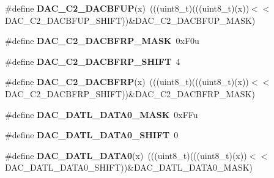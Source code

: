 \begin{DoxyCompactItemize}
\item 
\#define {\bfseries D\+A\+C\+\_\+\+C2\+\_\+\+D\+A\+C\+B\+F\+UP}(x)~(((uint8\+\_\+t)(((uint8\+\_\+t)(x))$<$$<$D\+A\+C\+\_\+\+C2\+\_\+\+D\+A\+C\+B\+F\+U\+P\+\_\+\+S\+H\+I\+FT))\&D\+A\+C\+\_\+\+C2\+\_\+\+D\+A\+C\+B\+F\+U\+P\+\_\+\+M\+A\+SK)\hypertarget{group__DAC__Register__Masks_ga8047d00b752e60690bae95e47bd8d75e}{}\label{group__DAC__Register__Masks_ga8047d00b752e60690bae95e47bd8d75e}

\item 
\#define {\bfseries D\+A\+C\+\_\+\+C2\+\_\+\+D\+A\+C\+B\+F\+R\+P\+\_\+\+M\+A\+SK}~0x\+F0u\hypertarget{group__DAC__Register__Masks_ga64b53e5effabf2e736fca6088752e6ea}{}\label{group__DAC__Register__Masks_ga64b53e5effabf2e736fca6088752e6ea}

\item 
\#define {\bfseries D\+A\+C\+\_\+\+C2\+\_\+\+D\+A\+C\+B\+F\+R\+P\+\_\+\+S\+H\+I\+FT}~4\hypertarget{group__DAC__Register__Masks_ga0ab880f693c25ecf491d3b76df611456}{}\label{group__DAC__Register__Masks_ga0ab880f693c25ecf491d3b76df611456}

\item 
\#define {\bfseries D\+A\+C\+\_\+\+C2\+\_\+\+D\+A\+C\+B\+F\+RP}(x)~(((uint8\+\_\+t)(((uint8\+\_\+t)(x))$<$$<$D\+A\+C\+\_\+\+C2\+\_\+\+D\+A\+C\+B\+F\+R\+P\+\_\+\+S\+H\+I\+FT))\&D\+A\+C\+\_\+\+C2\+\_\+\+D\+A\+C\+B\+F\+R\+P\+\_\+\+M\+A\+SK)\hypertarget{group__DAC__Register__Masks_ga63520cda0dd201e556b139f064b82ee3}{}\label{group__DAC__Register__Masks_ga63520cda0dd201e556b139f064b82ee3}

\item 
\#define {\bfseries D\+A\+C\+\_\+\+D\+A\+T\+L\+\_\+\+D\+A\+T\+A0\+\_\+\+M\+A\+SK}~0x\+F\+Fu\hypertarget{group__DAC__Register__Masks_ga06d752efe9ec5bab7d61ccf9c2689345}{}\label{group__DAC__Register__Masks_ga06d752efe9ec5bab7d61ccf9c2689345}

\item 
\#define {\bfseries D\+A\+C\+\_\+\+D\+A\+T\+L\+\_\+\+D\+A\+T\+A0\+\_\+\+S\+H\+I\+FT}~0\hypertarget{group__DAC__Register__Masks_gad9030129a0f34502c115abd36728d001}{}\label{group__DAC__Register__Masks_gad9030129a0f34502c115abd36728d001}

\item 
\#define {\bfseries D\+A\+C\+\_\+\+D\+A\+T\+L\+\_\+\+D\+A\+T\+A0}(x)~(((uint8\+\_\+t)(((uint8\+\_\+t)(x))$<$$<$D\+A\+C\+\_\+\+D\+A\+T\+L\+\_\+\+D\+A\+T\+A0\+\_\+\+S\+H\+I\+FT))\&D\+A\+C\+\_\+\+D\+A\+T\+L\+\_\+\+D\+A\+T\+A0\+\_\+\+M\+A\+SK)\hypertarget{group__DAC__Register__Masks_ga87995bd867b0ea7e137b5a5a8cbfdf1e}{}\label{group__DAC__Register__Masks_ga87995bd867b0ea7e137b5a5a8cbfdf1e}


\end{DoxyCompactItemize}
